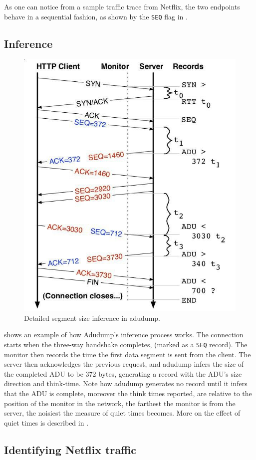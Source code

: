 As one can notice from a sample traffic trace from Netflix, the two endpoints
behave in a sequential fashion, as shown by the \texttt{SEQ} flag in
.


\subsection{Inference}

\begin{figure}[!h]
  \centering
  \includegraphics[width=0.6\columnwidth]{img/adudump.png}
  \caption{Detailed segment size inference in adudump.}
  \label{fig:adudump}
\end{figure}

 shows an example of how Adudump's inference process works.
The connection starts when the three-way handshake completes, (marked as a
\texttt{SEQ} record). The monitor then records the time the first data segment
is sent from the client. The server then acknowledges the previous request, and
adudump infers the size of the completed ADU to be 372 bytes, generating a
record with the ADU's size direction and think-time. Note how adudump generates
no record until it infers that the ADU is complete, moreover the think times
reported, are relative to the position of the monitor in the network, the
farthest the monitor is from the server, the noisiest the measure of quiet
times becomes. More on the effect of quiet times is described in
.

\subsection{Identifying Netflix traffic}\label{dns}

